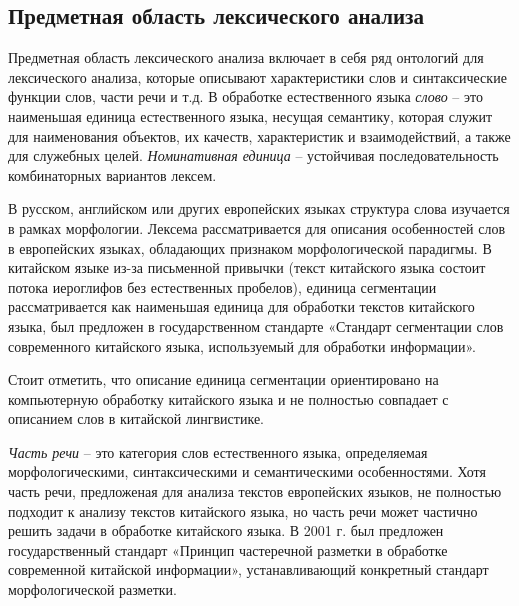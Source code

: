 \subsection{Предметная область лексического анализа}
Предметная область лексического анализа включает в себя ряд онтологий для лексического анализа, которые описывают характеристики слов и синтаксические функции слов, части речи и т.д. В обработке естественного языка \textit{слово} -- это наименьшая единица естественного языка, несущая семантику, которая служит для наименования объектов, их качеств, характеристик и взаимодействий, а также для служебных целей. \textit{Номинативная единица} -- устойчивая последовательность комбинаторных вариантов лексем.
\begin{SCn}
\end{SCn} 

В русском, английском или других европейских языках структура слова изучается в рамках морфологии. Лексема рассматривается для описания особенностей слов в европейских языках, обладающих признаком морфологической парадигмы. В китайском языке из-за письменной привычки (текст китайского языка состоит потока иероглифов без естественных пробелов), единица сегментации рассматривается как наименьшая единица для обработки текстов китайского языка, был предложен в государственном стандарте «Стандарт сегментации слов современного китайского языка, используемый для обработки информации». 
\begin{SCn}
\end{SCn}

Стоит отметить, что описание единица сегментации ориентировано на компьютерную обработку китайского языка и не полностью совпадает с описанием слов в китайской лингвистике.

\textit{Часть речи} -- это категория слов естественного языка, определяемая морфологическими, синтаксическими и семантическими особенностями. Хотя часть речи, предложеная для анализа текстов европейских языков, не полностью подходит к анализу текстов китайского языка, но часть речи может частично решить задачи в обработке китайского языка. В 2001 г. был предложен государственный стандарт «Принцип частеречной разметки
в обработке современной китайской информации», устанавливающий конкретный стандарт морфологической разметки. 
\begin{SCn}
\end{SCn}

